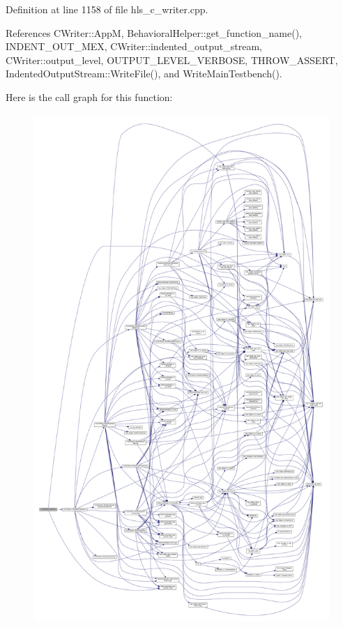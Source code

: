 Definition at line 1158 of file hls\+\_\+c\+\_\+writer.\+cpp.



References C\+Writer\+::\+AppM, Behavioral\+Helper\+::get\+\_\+function\+\_\+name(), I\+N\+D\+E\+N\+T\+\_\+\+O\+U\+T\+\_\+\+M\+EX, C\+Writer\+::indented\+\_\+output\+\_\+stream, C\+Writer\+::output\+\_\+level, O\+U\+T\+P\+U\+T\+\_\+\+L\+E\+V\+E\+L\+\_\+\+V\+E\+R\+B\+O\+SE, T\+H\+R\+O\+W\+\_\+\+A\+S\+S\+E\+RT, Indented\+Output\+Stream\+::\+Write\+File(), and Write\+Main\+Testbench().

Here is the call graph for this function\+:
\nopagebreak
\begin{figure}[H]
\begin{center}
\leavevmode
\includegraphics[height=550pt]{d4/db1/classHLSCWriter_a5956dd91971c6fca646d0f714afd6795_cgraph}
\end{center}
\end{figure}
\mbox{\label{classHLSCWriter_a2379e428afbccc4b235dca4ae28dbaf5}} 
